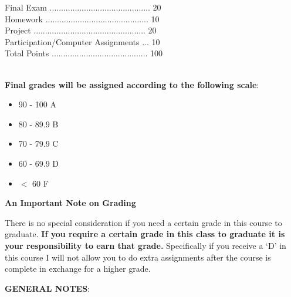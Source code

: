 \documentclass{article}
\begin{document}
Final Exam ............................................  20\\
Homework .............................................   10\\
Project .................................................    20\\
Participation/Computer Assignments ...  10\\
Total Points ..........................................  100\\
\\
\begin{center}
{\bf Final grades will be assigned according to the following scale}:
\end{center}
\begin{itemize}
\item 90 - 100 A
\item 80 - 89.9 B
\item 70 - 79.9 C
\item 60 - 69.9 D
\item $<$ 60 F
\end{itemize}
\vspace*{5pt}
\begin{center}
{\bf An Important Note on Grading}
\end{center}
There is no special consideration if you need a certain grade in this course to
graduate. {\bf If you require a certain grade in this class to graduate it
is your responsibility to earn that grade.} Specifically if you receive a `D'
in this course I will not allow you to do extra assignments after the course is
complete in exchange for a higher grade.
\\
\begin{center}
{\bf GENERAL NOTES}:
\end{center}
\end{document}

